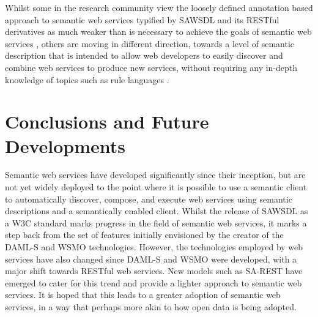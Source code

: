 Whilst some in the research community view the loosely defined annotation based approach
to semantic web services typified by SAWSDL and its RESTful derivatives as
much weaker than is necessary to achieve the goals of semantic web services
\cite{martin_bringing_2007}, others are moving in different direction, towards a
level of semantic description that is intended to allow web developers to easily discover
and combine web services to produce new services, without requiring any in-depth
knowledge of topics such as rule languages \cite{kopecky_hrests:_2008}\cite{lathem_sa-rest_2007}
\cite{sheth_semantics_2008}. 


\section{Conclusions and Future Developments}

Semantic web services have developed significantly since their inception, but
are not yet widely deployed to the point where it is possible
to use a semantic client to automatically discover, compose, and execute web
services using semantic descriptions and a semantically enabled client. Whilst the
release of SAWSDL as a W3C standard marks progress in the field of semantic web
services, it marks a step back from the set of features initially envisioned by
the creator of the DAML-S and WSMO technologies. However, the technologies
employed by web services have also changed since DAML-S and WSMO were developed, 
with a major shift towards RESTful web services. New models such as SA-REST 
have emerged to cater for this trend and provide a lighter approach
to semantic web services. It is hoped that this leads to a greater adoption of
semantic web services, in a way that perhaps more akin to how open data is being
adopted\cite{bizer_linked_2009}.


